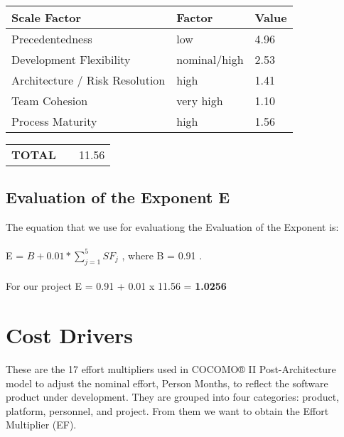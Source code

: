 \begin{center}
  \begin{tabular}{ l | l | l }%
   	\hline
	\textbf{Scale Factor} & \textbf{Factor} & \textbf{Value}
   	\\ \hline
    Precedentedness & low & 4.96
    \\\hline
    Development Flexibility & nominal/high & 2.53
    \\\hline
    Architecture / Risk Resolution & high & 1.41
    \\\hline
    Team Cohesion & very high & 1.10
 	\\\hline
 	Process Maturity & high & 1.56
   	\\\hline 
  \end{tabular}
  \begin{tabular}{ l l | l }%
   	\\\textbf{TOTAL} & & 11.56
  \end{tabular}
\end{center}

\subsection{Evaluation of the Exponent E}
The equation that we use for evaluationg the Evaluation of the Exponent is:
\\\\E = $B + 0.01 * \sum_{j=1}^{5} SF_j$ , where B = 0.91 .
\\\\For our project E = 0.91 + 0.01 x 11.56 = \textbf{1.0256}

\newpage %
\section{Cost Drivers}
These are the 17 effort multipliers used in COCOMO® II Post-Architecture model to adjust the nominal effort, Person Months, to reflect the software product under development. They are grouped into four categories: product, platform, personnel, and project. From them we want to obtain the Effort Multiplier (EF).

